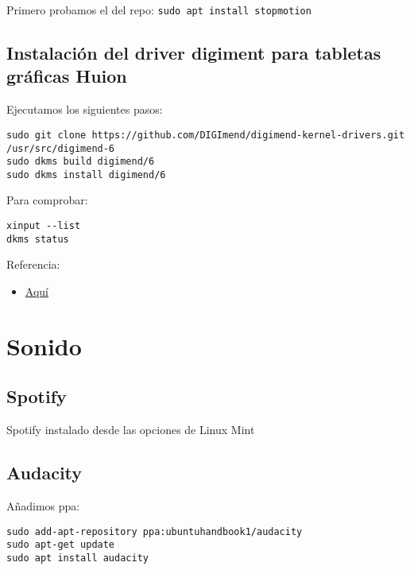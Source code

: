 \documentclass[
  12pt,
  spanish,
]{article}
\providecommand{\tightlist}{%
  \setlength{\itemsep}{0pt}\setlength{\parskip}{0pt}}
\begin{document}
Primero probamos el del repo: \texttt{sudo\ apt\ install\ stopmotion}

\hypertarget{instalaciuxf3n-del-driver-digiment-para-tabletas-gruxe1ficas-huion}{%
\subsection{Instalación del driver digiment para tabletas gráficas
Huion}\label{instalaciuxf3n-del-driver-digiment-para-tabletas-gruxe1ficas-huion}}

Ejecutamos los siguientes pasos:

\begin{verbatim}
sudo git clone https://github.com/DIGImend/digimend-kernel-drivers.git /usr/src/digimend-6
sudo dkms build digimend/6
sudo dkms install digimend/6
\end{verbatim}

Para comprobar:

\begin{verbatim}
xinput --list
dkms status
\end{verbatim}

Referencia:

\begin{itemize}
\tightlist
\item
  \href{https://davidrevoy.com/article331/setup-huion-giano-wh1409-tablet-on-linux-mint-18-1-ubuntu-16-04}{Aquí}
\end{itemize}

\hypertarget{sonido}{%
\section{Sonido}\label{sonido}}

\hypertarget{spotify}{%
\subsection{Spotify}\label{spotify}}

Spotify instalado desde las opciones de Linux Mint

\hypertarget{audacity}{%
\subsection{Audacity}\label{audacity}}

Añadimos ppa:

\begin{verbatim}
sudo add-apt-repository ppa:ubuntuhandbook1/audacity
sudo apt-get update
sudo apt install audacity
\end{verbatim}
\end{document}
